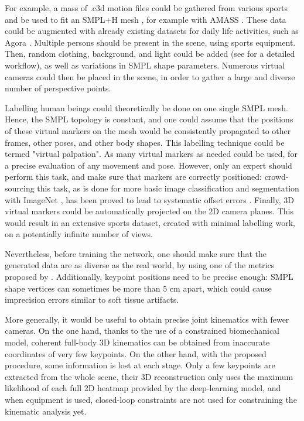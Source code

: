 For example, a mass of .c3d motion files could be gathered from various sports and be used to fit an SMPL+H mesh \cite{Pavlakos2019}, for example with AMASS \cite{Mahmood2019}. These data could be augmented with already existing datasets for daily life activities, such as Agora \cite{Patel2021}. Multiple persons should be present in the scene, using sports equipment. Then, random clothing, background, and light could be added (see \cite{Wood2021,Bolanos2021} for a detailed workflow), as well as variations in SMPL shape parameters. Numerous virtual cameras could then be placed in the scene, in order to gather a large and diverse number of perspective points.

Labelling human beings could theoretically be done on one single SMPL mesh. Hence, the SMPL topology is constant, and one could assume that the positions of these virtual markers on the mesh would be consistently propagated to other frames, other poses, and other body shapes. This labelling technique could be termed "virtual palpation". As many virtual markers as needed could be used, for a precise evaluation of any movement and pose. However, only an expert should perform this task, and make sure that markers are correctly positioned: crowd-sourcing this task, as is done for more basic image classification and segmentation with ImageNet \cite{Deng2009}, has been proved to lead to systematic offset errors \cite{Needham2021b}. Finally, 3D virtual markers could be automatically projected on the 2D camera planes. This would result in an extensive sports dataset, created with minimal labelling work, on a potentially infinite number of views. 

Nevertheless, before training the network, one should make sure that the generated data are as diverse as the real world, by using one of the metrics proposed by \cite{Borji2019, Borji2022}. Additionally, keypoint positions need to be precise enough: SMPL shape vertices can sometimes be more than 5 cm apart, which could cause imprecision errors similar to soft tissue artifacts. 

\vspace*{1.5cm}
More generally, it would be useful to obtain precise joint kinematics with fewer cameras. On the one hand, thanks to the use of a constrained biomechanical model, coherent full-body 3D kinematics can be obtained from inaccurate coordinates of very few keypoints. On the other hand, with the proposed procedure, some information is lost at each stage. Only a few keypoints are extracted from the whole scene, their 3D reconstruction only uses the maximum likelihood of each full 2D heatmap provided by the deep-learning model, and when equipment is used, closed-loop constraints are not used for constraining the kinematic analysis yet.

